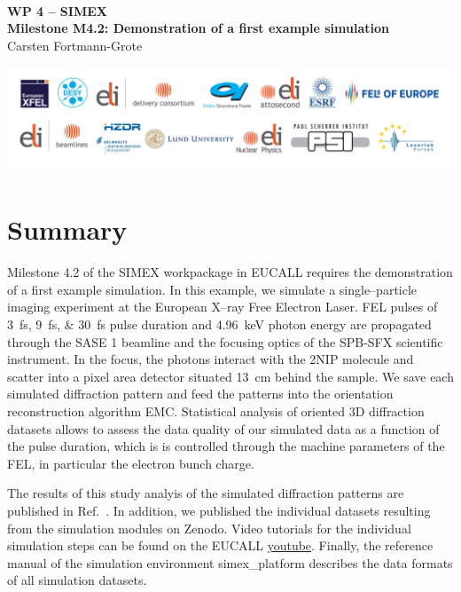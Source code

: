 \documentclass[12pt]{scrartcl}
\begin{document}
\makeatletter
\begin{titlepage}
\thispagestyle{scrheadings}
\begin{center}
  $~$\\
  \vspace{2cm}
  \Huge{\textbf{WP 4 -- SIMEX\\[1cm]
    Milestone M4.2: Demonstration of a first example simulation%
  }}\\
  \vspace{2cm}
  \large{ Carsten Fortmann-Grote}
  \vspace{1cm}
  \date{\today}
\end{center}
\vfill%
\includegraphics[width=\textwidth]{PartnerLogos.pdf}
\normalfont
\end{titlepage}
\makeatother
%
\tableofcontents
%
\section{Summary}
Milestone 4.2 of the SIMEX workpackage in EUCALL requires the demonstration of a
first example simulation. In this example, we simulate a single--particle
imaging experiment at the European X--ray Free Electron Laser. FEL pulses of
\SIlist{3;9;30}{\fs} pulse duration and \SI{4.96}{\keV} photon energy are propagated
through the SASE 1 beamline and the focusing optics of the SPB-SFX scientific
instrument. In the focus, the photons interact with the 2NIP molecule and
scatter into a pixel area detector situated \SI{13}{cm} behind the sample. We
save each simulated diffraction pattern and feed the patterns into the
orientation reconstruction algorithm EMC. Statistical analysis of oriented 3D
diffraction datasets allows to assess the data quality of our simulated data as
a function of the pulse duration, which is is controlled through the machine
parameters of the FEL, in particular the electron bunch charge.

The results of this study analyis of the simulated diffraction patterns are published in
Ref.~\cite{Fortmann-Grote2017}. In addition, we published the individual
datasets resulting from the simulation modules on Zenodo.
Video tutorials for the individual simulation steps can be found on the EUCALL
\href{https://www.youtube.com/eucall/}{youtube}.
Finally, the reference manual of the simulation environment simex\_platform
\cite{} describes the data formats of all simulation datasets.
\end{document}

